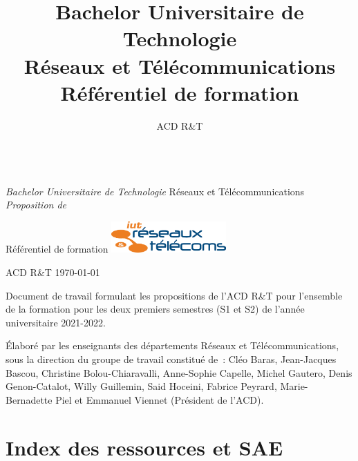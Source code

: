 \documentclass[10pt,lualatex,french]{article}
\title{Bachelor Universitaire de Technologie\\
Réseaux et Télécommunications\\
Référentiel de formation}
\author{ACD R\&T}%
\begin{document}
\setmainfont{Arial}
\renewcommand{\labelitemi}{$\bullet$}
\renewcommand{\labelitemii}{$\circ$}
\pagestyle{BO}

\thispagestyle{empty}
\begin{center}
~\\
\vskip 3cm
{\huge
{\em Bachelor Universitaire de Technologie}
\vskip 1cm
Réseaux et Télécommunications
}
\vskip 2cm
{\em Proposition de}

{\huge
Référentiel de formation
}
\vskip 2cm
\includegraphics[height=12mm]{img/logo_IUT_R_T_condense}

\vskip 1cm
{\Large
ACD R\&T
}
\vskip 5mm
\today


\vskip 2cm
\begin{boitepagetitre}
Document de travail formulant les propositions de l'ACD R\&T pour l'ensemble de la formation pour les deux premiers semestres (S1 et S2) de l'année universitaire 2021-2022.

\medskip
Élaboré par les enseignants des départements Réseaux et Télécommunications, sous la direction du groupe de travail constitué de~: Cléo Baras, Jean-Jacques Bascou, Christine Bolou-Chiaravalli, Anne-Sophie Capelle, Michel Gautero, Denis Genon-Catalot, Willy Guillemin, Said Hoceini, Fabrice Peyrard, Marie-Bernadette Piel et Emmanuel Viennet (Président de l'ACD).

\end{boitepagetitre}

\end{center}

\clearpage

\tableofcontents %
	

\clearpage
\section*{Index des ressources et SAE}
\end{document}
